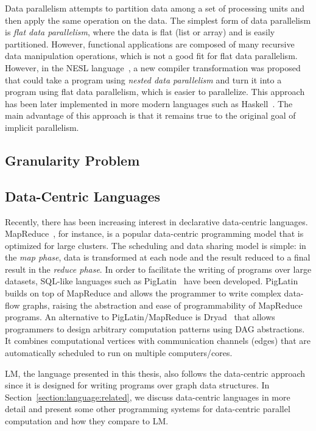 Data parallelism attempts to partition data among a set of processing units and
then apply the same operation on the data. The simplest form of data parallelism
is \emph{flat data parallelism}, where the data is flat (list or array) and is
easily partitioned. However, functional applications are composed of many recursive
data manipulation operations, which is not a good fit for flat data parallelism.
However, in the NESL language~\cite{Blelloch:1996:PPA:227234.227246}, a new compiler
transformation was proposed that could take a program using \emph{nested data
parallelism} and turn it into a program using flat data parallelism, which is
easier to parallelize. This approach has been later implemented in more
modern languages such as Haskell~\cite{Chakravarty07dataparallel}. The main
advantage of this approach is that it remains true to the original goal of
implicit parallelism.

\subsection{Granularity Problem}

\subsection{Data-Centric Languages}

Recently, there has been increasing interest in declarative data-centric
languages. MapReduce~\cite{Dean:2008:MSD:1327452.1327492}, for instance, is a
popular data-centric programming model that is optimized for large clusters. The
scheduling and data sharing model is simple: in the \emph{map phase}, data
is transformed at each node and the result reduced to a final result in the
\emph{reduce phase}. In order to facilitate the writing of programs over large
datasets, SQL-like languages such as
PigLatin~\cite{Olston:2008:PLN:1376616.1376726} have been developed. PigLatin
builds on top of MapReduce and allows the programmer to write complex data-flow
graphs, raising the abstraction and ease of programmability of MapReduce
programs. An alternative to PigLatin/MapReduce is
Dryad~\cite{Isard:2007:DDD:1272996.1273005} that allows programmers to design
arbitrary computation patterns using DAG abstractions. It combines computational
vertices with communication channels (edges) that are automatically scheduled to
run on multiple computers/cores.

LM, the language presented in this thesis, also follows the data-centric
approach since it is designed for writing programs over graph data structures.
In Section~\ref{section:language:related}, we discuss data-centric languages in
more detail and present some other programming systems for data-centric parallel
computation and how they compare to LM.

